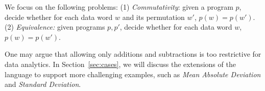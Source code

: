 We focus on the following problems: (1) \emph{Commutativity}: given a program $p$, decide whether for each data word $w$ and its permutation $w'$, $p(w) = p(w')$. (2) \emph{Equivalence:} given programs $p,p'$, decide whether for each data word $w$, $p(w)=p(w')$.

One may argue that allowing only additions and subtractions is too restrictive for data analytics. 
In Section~\ref{sec:cases}, we will discuss the extensions of the language to support more challenging examples, such as \emph{Mean Absolute Deviation} and \emph{Standard Deviation}.



